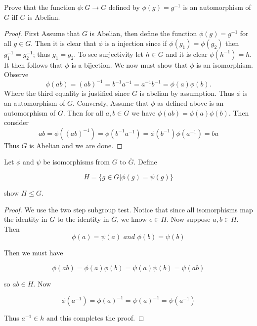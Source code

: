\documentclass[11pt]{homework}
\begin{document}
\maketitle

\question
Prove that the function $\phi : G \to G$ defined by $\phi (g) = g^{-1}$ is an automorphism of 
$G$ iff $G$ is Abelian. 

\begin{proof}
    First Assume that $G$ is Abelian, then define the function $\phi(g) = g^{-1}$ for all $g \in G$. Then it is clear that $\phi$ is 
    a injection since if $\phi(g_1) = \phi(g_2)$ then $g_1^{-1} = g_2^{-1}$; thus $g_1 = g_2$. To see surjectivity let $h \in G$ and it 
    is clear $\phi(h^{-1}) = h$. It then follows that $\phi$ is a bijection. We now must show that $\phi$ is an isomorphism. Observe 
    \[ \phi(ab) = (ab)^{-1} = b^{-1}a^{-1} = a^{-1}b^{-1} = \phi(a)\phi(b). \]  
    Where the third equality is justified since $G$ is abelian by assumption. Thus $\phi$ is an automorphism of $G$.  
    Conversly, Assume that $\phi$ as defined above is an automorphism of $G$. Then for all $a, b \in G$ we have $\phi(ab) = \phi(a)\phi(b)$. 
    Then consider 
    \[ ab = \phi((ab)^{-1}) = \phi(b^{-1}a^{-1}) = \phi(b^{-1})\phi(a^{-1}) = ba \]
    Thus $G$ is Abelian and we are done. 
    
\end{proof}

\question 
Let $\phi$ and $\psi$ be isomorphisms from $G$ to $\bar{G}$. Define 

\[H = \{ g \in G | \phi(g) = \psi(g) \}\]

show $H \leq G$. 

\begin{proof}
We use the two step subgroup test. Notice that since all isomorphisms map the identity in $G$ to the identity in $\bar{G}$, we know 
$e \in H$. Now suppose $a, b \in H$. Then 
\[\phi(a) = \psi(a) \textit{ and } \phi(b) = \psi(b)\]

Then we must have 

\[ \phi(ab) = \phi(a)\phi(b) = \psi(a)\psi(b) = \psi(ab)\]

so $ab \in H$. Now

\[ \phi(a^{-1}) = \phi(a)^{-1} = \psi(a)^{-1} = \psi(a^{-1}) \] 

Thus $a^{-1} \in h$ and this completes the proof. 


    
\end{proof}
\end{document}
